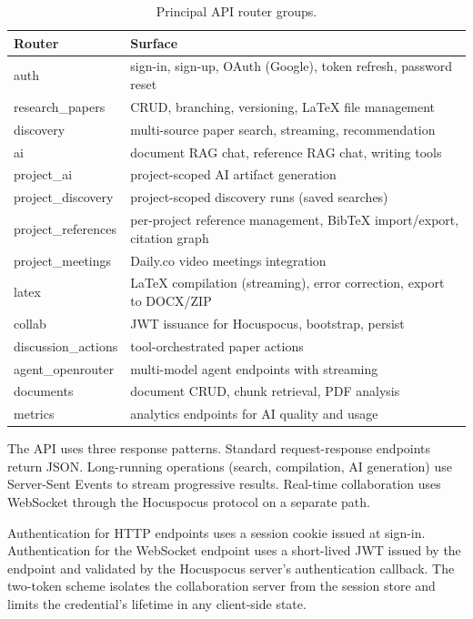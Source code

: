 \begin{table}[h]
\centering
\caption{Principal API router groups.}
\label{tab:api}
\small
\begin{tabularx}{\textwidth}{l X}
\toprule
\textbf{Router} & \textbf{Surface} \\
\midrule
auth                  & sign-in, sign-up, OAuth (Google), token refresh, password reset \\
research\_papers      & CRUD, branching, versioning, LaTeX file management \\
discovery             & multi-source paper search, streaming, recommendation \\
ai                    & document RAG chat, reference RAG chat, writing tools \\
project\_ai           & project-scoped AI artifact generation \\
project\_discovery    & project-scoped discovery runs (saved searches) \\
project\_references   & per-project reference management, BibTeX import/export, citation graph \\
project\_meetings     & Daily.co video meetings integration \\
latex                 & LaTeX compilation (streaming), error correction, export to DOCX/ZIP \\
collab                & JWT issuance for Hocuspocus, bootstrap, persist \\
discussion\_actions   & tool-orchestrated paper actions \\
agent\_openrouter     & multi-model agent endpoints with streaming \\
documents             & document CRUD, chunk retrieval, PDF analysis \\
metrics               & analytics endpoints for AI quality and usage \\
\bottomrule
\end{tabularx}
\end{table}

The API uses three response patterns. Standard request-response endpoints return JSON. Long-running operations (search, compilation, AI generation) use Server-Sent Events to stream progressive results. Real-time collaboration uses WebSocket through the Hocuspocus protocol on a separate path.

Authentication for HTTP endpoints uses a session cookie issued at sign-in. Authentication for the WebSocket endpoint uses a short-lived JWT issued by the  endpoint and validated by the Hocuspocus server's authentication callback. The two-token scheme isolates the collaboration server from the session store and limits the credential's lifetime in any client-side state.

